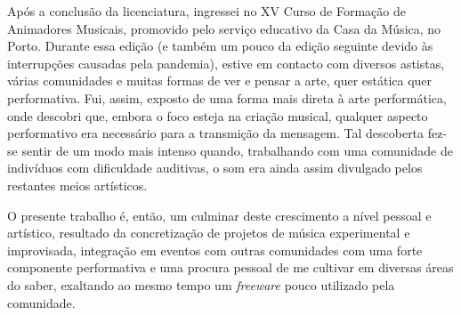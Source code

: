 \documentclass[../main.tex]{subfiles}
\begin{document}
Após a conclusão da licenciatura, ingressei no XV Curso de Formação de Animadores Musicais, promovido pelo serviço educativo da Casa da Música, no Porto. Durante essa edição (e também um pouco da edição seguinte devido às interrupções causadas pela pandemia), estive em contacto com diversos astistas, várias comunidades e muitas formas de ver e pensar a arte, quer estática quer performativa. Fui, assim, exposto de uma forma mais direta à arte performática, onde descobri que, embora o foco esteja na criação musical, qualquer aspecto performativo era necessário para a transmição da mensagem. Tal descoberta fez-se sentir de um modo mais intenso quando, trabalhando com uma comunidade de indivíduos com dificuldade auditivas, o som era ainda assim divulgado pelos restantes meios artísticos.

O presente trabalho é, então, um culminar deste crescimento a nível pessoal e artístico, resultado da concretização de projetos de música experimental e improvisada, integração em eventos com outras comunidades com uma forte componente performativa e uma procura pessoal de me cultivar em diversas áreas do saber, exaltando ao mesmo tempo um \textsl{freeware} pouco utilizado pela comunidade.
\end{document}
